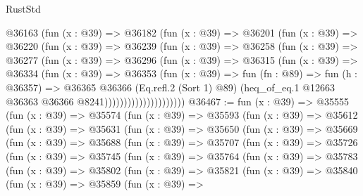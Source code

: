 \begin{lexlean}{RustStd}
\begin{coremodule}
                    @36163
                      (fun (x : @39) =>
                      @36182
                        (fun (x : @39) =>
                        @36201
                          (fun (x : @39) =>
                          @36220
                            (fun (x : @39) =>
                            @36239
                              (fun (x : @39) =>
                              @36258
                                (fun (x : @39) =>
                                @36277
                                  (fun (x : @39) =>
                                  @36296
                                    (fun (x : @39) =>
                                    @36315
                                      (fun (x : @39) =>
                                      @36334
                                        (fun (x : @39) =>
                                        @36353
                                          (fun (x : @39) =>
                                          fun (fn : @89) =>
                                          fun (h : @36357) =>
                                          @36365
                                            @36366
                                            (Eq.refl.{2} (Sort 1) @89)
                                            (heq_of_eq.{1}
                                              @12663
                                              @36363
                                              @36366
                                              @8241)))))))))))))))))))))
@36467 := fun (x : @39) =>
  @35555
    (fun (x : @39) =>
    @35574
      (fun (x : @39) =>
      @35593
        (fun (x : @39) =>
        @35612
          (fun (x : @39) =>
          @35631
            (fun (x : @39) =>
            @35650
              (fun (x : @39) =>
              @35669
                (fun (x : @39) =>
                @35688
                  (fun (x : @39) =>
                  @35707
                    (fun (x : @39) =>
                    @35726
                      (fun (x : @39) =>
                      @35745
                        (fun (x : @39) =>
                        @35764
                          (fun (x : @39) =>
                          @35783
                            (fun (x : @39) =>
                            @35802
                              (fun (x : @39) =>
                              @35821
                                (fun (x : @39) =>
                                @35840
                                  (fun (x : @39) =>
                                  @35859
                                    (fun (x : @39) =>

\end{coremodule}
\end{lexlean}
